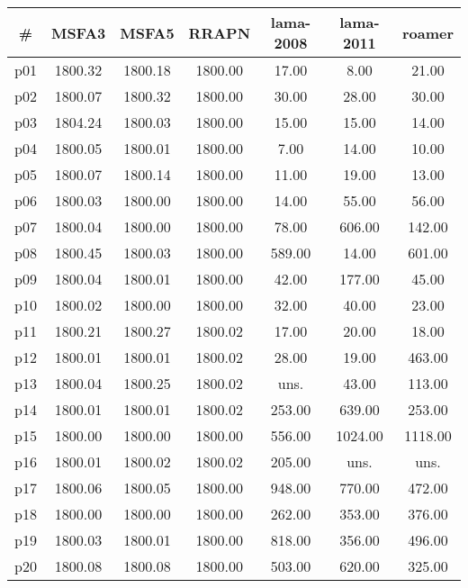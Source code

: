 \begin{tabular}{ccccccc}
\toprule
\textbf{\#} & \textbf{MSFA3} & \textbf{MSFA5} & \textbf{RRAPN} & \textbf{lama-2008} & \textbf{lama-2011} & \textbf{roamer}\\
\midrule
p01 & 1800.32 & 1800.18 & 1800.00 & 17.00 & 8.00 & 21.00\\
p02 & 1800.07 & 1800.32 & 1800.00 & 30.00 & 28.00 & 30.00\\
p03 & 1804.24 & 1800.03 & 1800.00 & 15.00 & 15.00 & 14.00\\
p04 & 1800.05 & 1800.01 & 1800.00 & 7.00 & 14.00 & 10.00\\
p05 & 1800.07 & 1800.14 & 1800.00 & 11.00 & 19.00 & 13.00\\
p06 & 1800.03 & 1800.00 & 1800.00 & 14.00 & 55.00 & 56.00\\
p07 & 1800.04 & 1800.00 & 1800.00 & 78.00 & 606.00 & 142.00\\
p08 & 1800.45 & 1800.03 & 1800.00 & 589.00 & 14.00 & 601.00\\
p09 & 1800.04 & 1800.01 & 1800.00 & 42.00 & 177.00 & 45.00\\
p10 & 1800.02 & 1800.00 & 1800.00 & 32.00 & 40.00 & 23.00\\
p11 & 1800.21 & 1800.27 & 1800.02 & 17.00 & 20.00 & 18.00\\
p12 & 1800.01 & 1800.01 & 1800.02 & 28.00 & 19.00 & 463.00\\
p13 & 1800.04 & 1800.25 & 1800.02 & uns. & 43.00 & 113.00\\
p14 & 1800.01 & 1800.01 & 1800.02 & 253.00 & 639.00 & 253.00\\
p15 & 1800.00 & 1800.00 & 1800.00 & 556.00 & 1024.00 & 1118.00\\
p16 & 1800.01 & 1800.02 & 1800.02 & 205.00 & uns. & uns.\\
p17 & 1800.06 & 1800.05 & 1800.00 & 948.00 & 770.00 & 472.00\\
p18 & 1800.00 & 1800.00 & 1800.00 & 262.00 & 353.00 & 376.00\\
p19 & 1800.03 & 1800.01 & 1800.00 & 818.00 & 356.00 & 496.00\\
p20 & 1800.08 & 1800.08 & 1800.00 & 503.00 & 620.00 & 325.00\\
\bottomrule
\end{tabular}

